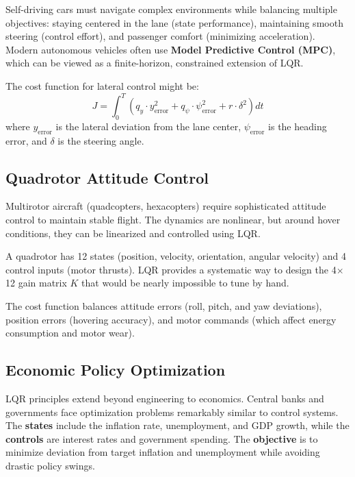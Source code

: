 Self-driving cars must navigate complex environments while balancing multiple objectives: staying centered in the lane (state performance), maintaining smooth steering (control effort), and passenger comfort (minimizing acceleration). Modern autonomous vehicles often use \textbf{Model Predictive Control (MPC)}, which can be viewed as a finite-horizon, constrained extension of LQR.

The cost function for lateral control might be:
\begin{equation}
J = \int_0^T \left( q_y \cdot y_{\text{error}}^2 + q_\psi \cdot \psi_{\text{error}}^2 + r \cdot \delta^2 \right) dt
\end{equation}
where $y_{\text{error}}$ is the lateral deviation from the lane center, $\psi_{\text{error}}$ is the heading error, and $\delta$ is the steering angle.

\subsection{Quadrotor Attitude Control}

Multirotor aircraft (quadcopters, hexacopters) require sophisticated attitude control to maintain stable flight. The dynamics are nonlinear, but around hover conditions, they can be linearized and controlled using LQR.

A quadrotor has 12 states (position, velocity, orientation, angular velocity) and 4 control inputs (motor thrusts). LQR provides a systematic way to design the 4$\times$12 gain matrix $K$ that would be nearly impossible to tune by hand.

The cost function balances attitude errors (roll, pitch, and yaw deviations), position errors (hovering accuracy), and motor commands (which affect energy consumption and motor wear).

\subsection{Economic Policy Optimization}

LQR principles extend beyond engineering to economics. Central banks and governments face optimization problems remarkably similar to control systems. The \textbf{states} include the inflation rate, unemployment, and GDP growth, while the \textbf{controls} are interest rates and government spending. The \textbf{objective} is to minimize deviation from target inflation and unemployment while avoiding drastic policy swings.

